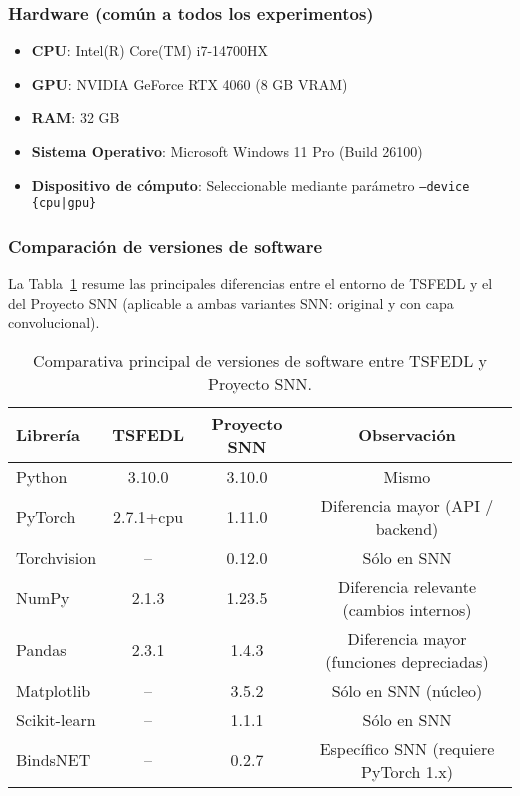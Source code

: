 \subsubsection*{Hardware (común a todos los experimentos)}
\begin{itemize}
    \item \textbf{CPU}: Intel(R) Core(TM) i7-14700HX
    \item \textbf{GPU}: NVIDIA GeForce RTX 4060 (8 GB VRAM)
    \item \textbf{RAM}: 32 GB
    \item \textbf{Sistema Operativo}: Microsoft Windows 11 Pro (Build 26100)
    \item \textbf{Dispositivo de cómputo}: Seleccionable mediante parámetro \texttt{--device \{cpu|gpu\}}
\end{itemize}

\subsubsection*{Comparación de versiones de software}
La Tabla~\ref{tab:comparativa_sw} resume las principales diferencias entre el entorno de TSFEDL y el del Proyecto SNN (aplicable a ambas variantes SNN: original y con capa convolucional).

\begin{table}[htbp]
\centering
\small
\begin{tabular}{lccc}
\hline\hline
\textbf{Librería} & \textbf{TSFEDL} & \textbf{Proyecto SNN} & \textbf{Observación} \\
\hline
Python        & 3.10.0     & 3.10.0     & Mismo \\
PyTorch       & 2.7.1+cpu  & 1.11.0     & Diferencia mayor (API / backend) \\
Torchvision   & --         & 0.12.0     & Sólo en SNN \\
NumPy         & 2.1.3      & 1.23.5     & Diferencia relevante (cambios internos) \\
Pandas        & 2.3.1      & 1.4.3      & Diferencia mayor (funciones depreciadas) \\
Matplotlib    & --         & 3.5.2      & Sólo en SNN (núcleo) \\
Scikit-learn  & --         & 1.1.1      & Sólo en SNN \\
BindsNET      & --         & 0.2.7      & Específico SNN (requiere PyTorch 1.x) \\
\hline\hline
\end{tabular}
\caption{Comparativa principal de versiones de software entre TSFEDL y Proyecto SNN.}
\label{tab:comparativa_sw}
\end{table}



